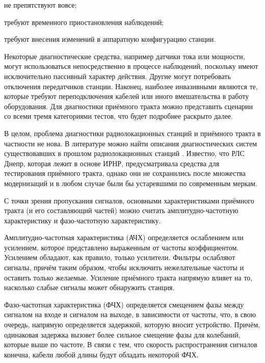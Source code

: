 \documentclass{report}
\begin{document}
\begin{enummarker}
    \item не препятствуют вовсе;
    \item требуют временного приостановления наблюдений;
    \item требуют внесения изменений в аппаратную конфигурацию станции.
\end{enummarker}

Некоторые диагностические средства, например датчики тока или мощности, могут использоваться непосредственно в процессе наблюдений, поскольку имеют исключительно пассивный характер действия. Другие могут потребовать отключения передатчиков станции. Наконец, наиболее инвазивными являются те, которые требуют переподключения кабелей или иного вмешательства в работу оборудования. Для диагностики приёмного тракта можно представить сценарии со всеми тремя категориями тестов, что будет подробнее раскрыто далее.

В целом, проблема диагностики радиолокационных станций и приёмного тракта в частности не нова. В литературе можно найти описания диагностических систем существовавших в прошлом радиолокационных станций \cite{abm}. Известно, что РЛС Днепр, которая лежит в основе ИРНР, предусматривала средства для тестирования приёмного тракта, однако они не сохранились после множества модернизаций и в любом случае были бы устаревшими по современным меркам.

С точки зрения пропускания сигналов, основными характеристиками  приёмного тракта (и его составляющий частей) можно считать амплитудно-частотную характеристику и фазо-частотную характеристику.

Амплитудно-частотная характеристика (АЧХ) определяется ослаблением или усилением, которое представлено выраженным от частоты коэффициентом. Усилением обладают, как правило, только усилители. Фильтры ослабляют сигналы, причём таким образом, чтобы исключить нежелательные частоты и оставить только желаемые. Усиление приёмного тракта напрямую влияет на то, насколько слабые сигналы может обнаружить станция.

Фазо-частотная характеристика (ФЧХ) определяется смещением фазы между сигналом на входе и сигналом на выходе, в зависимости от частоты, что, в свою очередь, напрямую определяется задержкой, которую вносит устройство. Причём, одинаковая задержка вызовет более сильное смещение фазы для колебаний, которые выше по частоте. В связи с тем, что скорость распространения сигналов конечна, кабели любой длины будут обладать некоторой ФЧХ.
\end{document}
